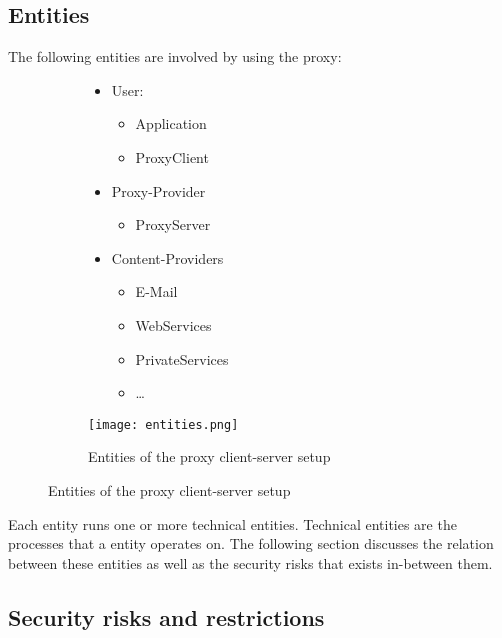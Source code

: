 \documentclass[12pt, a4paper]{scrartcl}
\begin{document}
\subsection{Entities}
The following entities are involved by using the proxy:
\begin{figure}[H]
    \centering
    \begin{subfigure}{0.45\textwidth}
        \begin{itemize}
            \item User:
            \begin{itemize}
                \item Application
                \item ProxyClient
            \end{itemize}
            \item Proxy-Provider
            \begin{itemize}
                \item ProxyServer
            \end{itemize}
            \item Content-Providers
            \begin{itemize}
                \item E-Mail
                \item WebServices
                \item PrivateServices
                \item \ldots
            \end{itemize}
        \end{itemize}
    \end{subfigure}
    \begin{subfigure}{0.5\textwidth}
        \centering
        \texttt{[image: entities.png]}
        \caption{Entities of the proxy client-server setup}
        \label{fig::enti}
    \end{subfigure}
\end{figure}

\noindent Each entity runs one or more technical entities. Technical entities are the processes that a entity operates on.\newline
The following section discusses the relation between these entities as well as the security risks that exists in-between them.
\subsection{Security risks and restrictions}
\end{document}
